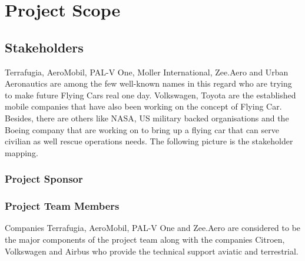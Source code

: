 \chapter{Project Scope}

\section{Stakeholders}

Terrafugia, AeroMobil, PAL-V One, Moller International, Zee.Aero and Urban Aeronautics are among the few well-known names in this regard who are trying to make future Flying Cars real one day. Volkswagen, Toyota are the established mobile companies that have also been working on the concept of Flying Car. Besides, there are others like NASA, US military backed organisations and the Boeing company that are working on to bring up a flying car that can serve civilian as well rescue operations needs. The following picture is the stakeholder mapping.

{\color{red}{插图}}

\subsection{Project Sponsor}

\subsection{Project Team Members}

Companies Terrafugia, AeroMobil, PAL-V One and Zee.Aero are considered to be the major components of the project team along with the companies Citroen, Volkswagen and Airbus who provide the technical support aviatic and terrestrial.

